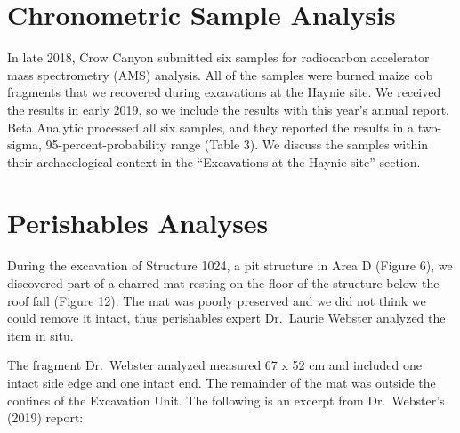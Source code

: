 \documentclass[
  12pt,
]{krantz}
\begin{document}
\hypertarget{chronometric-sample-analysis}{%
\section{Chronometric Sample Analysis}\label{chronometric-sample-analysis}}

In late 2018, Crow Canyon submitted six samples for radiocarbon
accelerator mass spectrometry (AMS) analysis. All of the samples were
burned maize cob fragments that we recovered during excavations at the
Haynie site. We received the results in early 2019, so we include the
results with this year's annual report. Beta Analytic processed all six
samples, and they reported the results in a two-sigma,
95-percent-probability range (Table 3). We discuss the samples within
their archaeological context in the ``Excavations at the Haynie site''
section.

\hypertarget{perishables-analyses}{%
\section{Perishables Analyses}\label{perishables-analyses}}

During the excavation of Structure 1024, a pit structure in Area D
(Figure 6), we discovered part of a charred mat resting on the floor of
the structure below the roof fall (Figure 12). The mat was poorly
preserved and we did not think we could remove it intact, thus
perishables expert Dr.~Laurie Webster analyzed the item in situ.

The fragment Dr.~Webster analyzed measured 67 x 52 cm and included one
intact side edge and one intact end. The remainder of the mat was
outside the confines of the Excavation Unit. The following is an excerpt
from Dr.~Webster's (2019) report:
\end{document}
